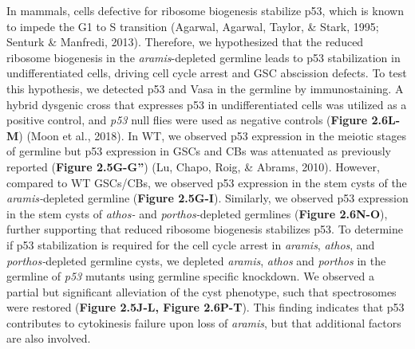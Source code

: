 \documentclass[12pt,oneside]{reedthesis}
\begin{document}

\textbf{\hfill\break
}

In mammals, cells defective for ribosome biogenesis stabilize p53, which is known to impede the G1 to S transition (Agarwal, Agarwal, Taylor, \& Stark, 1995; Senturk \& Manfredi, 2013). Therefore, we hypothesized that the reduced ribosome biogenesis in the \emph{aramis}-depleted germline leads to p53 stabilization in undifferentiated cells, driving cell cycle arrest and GSC abscission defects. To test this hypothesis, we detected p53 and Vasa in the germline by immunostaining. A hybrid dysgenic cross that expresses p53 in undifferentiated cells was utilized as a positive control, and \emph{p53} null flies were used as negative controls (\textbf{Figure 2.6L-M}) (Moon et al., 2018). In WT, we observed p53 expression in the meiotic stages of germline but p53 expression in GSCs and CBs was attenuated as previously reported (\textbf{Figure 2.5G-G''}) (Lu, Chapo, Roig, \& Abrams, 2010). However, compared to WT GSCs/CBs, we observed p53 expression in the stem cysts of the \emph{aramis-}depleted germline (\textbf{Figure 2.5G-I}). Similarly, we observed p53 expression in the stem cysts of \emph{athos-} and \emph{porthos-}depleted germlines (\textbf{Figure 2.6N-O}), further supporting that reduced ribosome biogenesis stabilizes p53. To determine if p53 stabilization is required for the cell cycle arrest in \emph{aramis}, \emph{athos}, and \emph{porthos-}depleted germline cysts, we depleted \emph{aramis}, \emph{athos} and \emph{porthos} in the germline of \emph{p53} mutants using germline specific knockdown. We observed a partial but significant alleviation of the cyst phenotype, such that spectrosomes were restored (\textbf{Figure 2.5J-L, Figure 2.6P-T}). This finding indicates that p53 contributes to cytokinesis failure upon loss of \emph{aramis}, but that additional factors are also involved.
\end{document}

